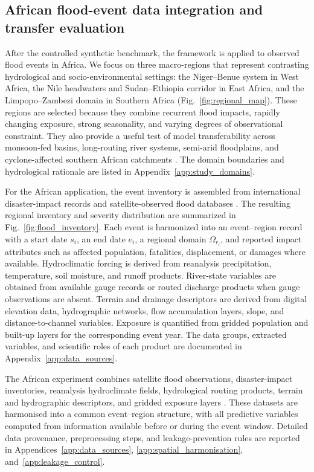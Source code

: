 \documentclass[pdflatex,sn-mathphys-ay]{sn-jnl}
\theoremstyle{thmstyleone}
\begin{document}
\subsection{African flood-event data integration and transfer evaluation}
\label{subsec:africa_data_transfer}

After the controlled synthetic benchmark, the framework is applied to
observed flood events in Africa.  We focus on three macro-regions that
represent contrasting hydrological and socio-environmental settings:
the Niger--Benue system in West Africa, the Nile headwaters and
Sudan--Ethiopia corridor in East Africa, and the Limpopo--Zambezi
domain in Southern Africa (Fig.~\ref{fig:regional_map}).  These regions
are selected because they combine recurrent flood impacts, rapidly
changing exposure, strong seasonality, and varying degrees of
observational constraint.  They also provide a useful test of model
transferability across monsoon-fed basins, long-routing river systems,
semi-arid floodplains, and cyclone-affected southern African
catchments \citep{DiBaldassarre2010,Thiemig2015,Bodian2018,Dembele2020}.
The domain boundaries and hydrological rationale are
listed in Appendix~\ref{app:study_domains}.


For the African application, the event inventory is assembled from
international disaster-impact records and satellite-observed flood
databases \citep{EMDAT2024,Tellman2021}.  The resulting regional
inventory and severity distribution are summarized in
Fig.~\ref{fig:flood_inventory}.  Each event is harmonized into an event--region record with
a start date $s_i$, an end date $e_i$, a regional domain
$\Omega_{r_i}$, and reported impact attributes such as affected
population, fatalities, displacement, or damages where available.
Hydroclimatic forcing is derived from reanalysis precipitation,
temperature, soil moisture, and runoff products.  River-state variables
are obtained from available gauge records or routed discharge products
when gauge observations are absent.  Terrain and drainage descriptors
are derived from digital elevation data, hydrographic networks, flow
accumulation layers, slope, and distance-to-channel variables.
Exposure is quantified from gridded population and built-up layers for
the corresponding event year.  The data groups, extracted variables,
and scientific roles of each product are documented in
Appendix~\ref{app:data_sources}.

The African experiment combines satellite flood observations,
disaster-impact inventories, reanalysis hydroclimate fields,
hydrological routing products, terrain and hydrographic descriptors,
and gridded exposure layers
\citep{EMDAT2024,Tellman2021,VanDerKnijff2010,Alfieri2013,Thiemig2015}.  These datasets are harmonised into a
common event--region structure, with all predictive variables computed
from information available before or during the event window.  Detailed
data provenance, preprocessing steps, and leakage-prevention rules are
reported in Appendices~\ref{app:data_sources},
\ref{app:spatial_harmonisation}, and~\ref{app:leakage_control}.
\end{document}
